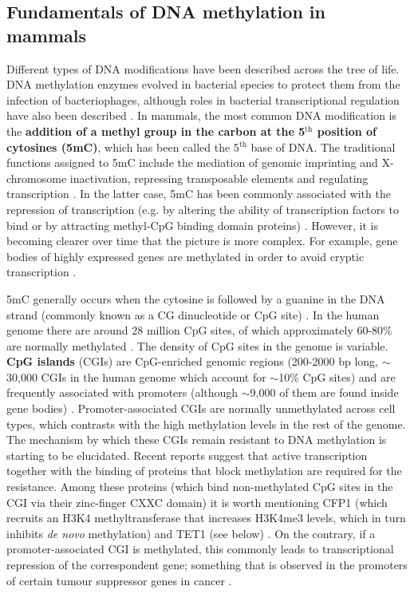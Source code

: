 \smallskip

\subsection{Fundamentals of DNA methylation in mammals} \label{s:1.2.2}

\smallskip

Different types of DNA modifications have been described across the tree of life. DNA methylation enzymes evolved in bacterial species to protect them from the infection of bacteriophages, although roles in bacterial transcriptional regulation have also been described  \cite{Sanchez-Romero2015}. In mammals, the most common DNA modification is the \textbf{addition of a methyl group in the carbon at the 5$^{\text{th}}$ position of cytosines (\acrshort{5mC})}, which has been called the 5$^{\text{th}}$ base of DNA. The traditional functions assigned to 5mC include the mediation of genomic imprinting and X-chromosome inactivation, repressing transposable elements and regulating transcription \cite{Wu2017}. In the latter case, 5mC has been commonly associated with the repression of transcription (e.g. by altering the ability of transcription factors to bind or by attracting methyl-CpG binding domain proteins) \cite{Li2014}. However, it is becoming clearer over time that the picture is more complex. For example, gene bodies of highly expressed genes are methylated in order to avoid cryptic transcription \cite{Neri2017}.

\bigskip

5mC generally occurs when the cytosine is followed by a guanine in the DNA strand (commonly known as a CG dinucleotide or CpG site) \cite{Li2014,Smith2013}. In the human genome there are around 28 million CpG sites, of which approximately 60-80\% are normally methylated \cite{Smith2013}. The density of CpG sites in the genome is variable. \textbf{CpG islands} (\acrshort{CGI}s) are CpG-enriched genomic regions (200-2000 bp long, $\sim$30,000 CGIs in the human genome which account for $\sim$10\% CpG sites) and are frequently associated with promoters (although $\sim$9,000 of them are found inside gene bodies) \cite{Smith2013,Jeziorska2017,Zeng2014}. Promoter-associated CGIs are normally unmethylated across cell types, which contrasts with the high methylation levels in the rest of the genome. The mechanism by which these CGIs remain resistant to DNA methylation is starting to be elucidated. Recent reports suggest that active transcription together with the binding of proteins that block methylation are required for the resistance. Among these proteins (which bind non-methylated CpG sites in the CGI via their zinc-finger CXXC domain) it is worth mentioning CFP1 (which recruits an H3K4 methyltransferase that increases H3K4me3 levels, which in turn inhibits \textit{de novo} methylation) and TET1 (see below) \cite{Takahashi2017}. On the contrary, if a promoter-associated CGI is methylated, this commonly leads to transcriptional repression of the correspondent gene; something that is observed in the promoters of certain tumour suppressor genes in cancer \cite{Flavahan2017}. 

